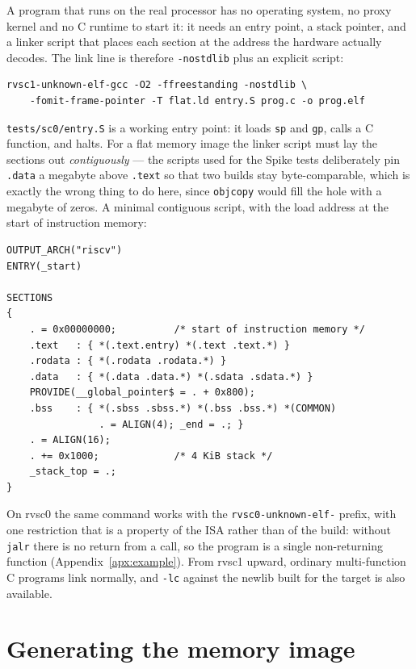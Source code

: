 A program that runs on the real processor has no operating system, no proxy kernel and no C
runtime to start it: it needs an entry point, a stack pointer, and a linker script that places
each section at the address the hardware actually decodes. The link line is therefore
\texttt{-nostdlib} plus an explicit script:

\begin{lstlisting}
rvsc1-unknown-elf-gcc -O2 -ffreestanding -nostdlib \
    -fomit-frame-pointer -T flat.ld entry.S prog.c -o prog.elf
\end{lstlisting}

\nolinkurl{tests/sc0/entry.S} is a working entry point: it loads \texttt{sp} and \texttt{gp}, calls
a C function, and halts. For a flat memory image the linker script must lay the sections out
\emph{contiguously} --- the scripts used for the Spike tests deliberately pin \texttt{.data} a
megabyte above \texttt{.text} so that two builds stay byte-comparable, which is exactly the wrong
thing to do here, since \texttt{objcopy} would fill the hole with a megabyte of zeros. A minimal
contiguous script, with the load address at the start of instruction memory:

\begin{lstlisting}
OUTPUT_ARCH("riscv")
ENTRY(_start)

SECTIONS
{
    . = 0x00000000;          /* start of instruction memory */
    .text   : { *(.text.entry) *(.text .text.*) }
    .rodata : { *(.rodata .rodata.*) }
    .data   : { *(.data .data.*) *(.sdata .sdata.*) }
    PROVIDE(__global_pointer$ = . + 0x800);
    .bss    : { *(.sbss .sbss.*) *(.bss .bss.*) *(COMMON)
                . = ALIGN(4); _end = .; }
    . = ALIGN(16);
    . += 0x1000;             /* 4 KiB stack */
    _stack_top = .;
}
\end{lstlisting}

On rvsc0 the same command works with the \nolinkurl{rvsc0-unknown-elf-} prefix, with one
restriction that is a property of the ISA rather than of the build: without \texttt{jalr} there is
no return from a call, so the program is a single non-returning function
(Appendix~\ref{apx:example}). From rvsc1 upward, ordinary multi-function C programs link normally,
and \texttt{-lc} against the newlib built for the target is also available.

\section{Generating the memory image} \label{apx:usage-binary}

